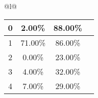 \begin{longtable}{@{}l@{}}
\begin{minipage}{\textwidth}
\begin{tabular}{|c|c|c|c|}
0 & 2.00\% & 88.00\% & \textcolor{green}{\ding{51}} \\ \hline
1 & 71.00\% & 86.00\% & \textcolor{green}{\ding{51}} \\ \hline
2 & 0.00\% & 23.00\% & \textcolor{green}{\ding{51}} \\ \hline
3 & 4.00\% & 32.00\% & \textcolor{green}{\ding{51}} \\ \hline
4 & 7.00\% & 29.00\% & \textcolor{green}{\ding{51}} \\ \hline
\end{tabular}
\end{minipage}\\[2ex]
\end{longtable}